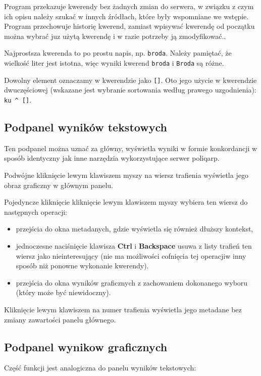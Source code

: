 \documentclass{mwart}
\def\key#1{\textbf{#1}}
\begin{document}
Program przekazuje kwerendy bez żadnych zmian do serwera, w związku z
czym ich opisu należy szukać w innych źródłach, które były wspomniane
we wstępie. Program przechowuje historię kwerend, zamiast wpisywać
kwerendę od początku można wybrać juz użytą kwerendę i w razie
potrzeby ją zmodyfikować..

Najprostsza kwerenda to po prostu napis, np. \texttt{broda}. Należy
pamiętać, że wielkość liter jest istotna, więc wyniki kwerend
\texttt{broda} i \texttt{Broda} są różne.

Dowolny element oznaczamy w kwerendzie jako \texttt{[]}. Oto jego
użycie w kwerendzie dwuczęściowej (wskazane jest wybranie sortowania
według prawego uzgodnienia): \verb|ku ^ []|.

\subsection{Podpanel wyników tekstowych}
\label{sec:podp-wynik-tekst}

Ten podpanel można uznać za główny, wyświetla wyniki w formie
konkordancji w sposób identyczny jak inne narzędzia wykorzystujące
serwer \textsf{poliqarp}.

Podwójne kliknięcie lewym klawiszem myszy na wiersz trafienia wyświetla jego obraz
graficzny w głównym panelu.

Pojedyncze kliknięcie kliknięcie lewym klawiszem myszy wybiera ten wiersz do następnych operacji:
\begin{itemize}
\item przejścia do okna metadanych, gdzie wyświetla się również dłuższy kontekst,
\item jednoczesne naciśnięcie klawisza \key{Ctrl} i \key{Backspace}
  usuwa z listy trafień ten wiersz jako nieinteresujący (nie ma
  możliwości cofnięcia tej operacjiw inny sposób niż ponowne wykonanie
  kwerendy).
\item przejścia do okna wyników graficznych z zachowaniem dokonanego
  wyboru (który może być niewidoczny).
\end{itemize}

Kliknięcie lewym klawiszem na numer trafienia wyświetla jego metadane
bez zmiany zawartości panelu głównego.

\subsection{Podpanel wynikow graficznych}
\label{sec:podp-wynik-graf}

Część funkcji jest analogiczna do panelu wyników tekstowych:
\end{document}
